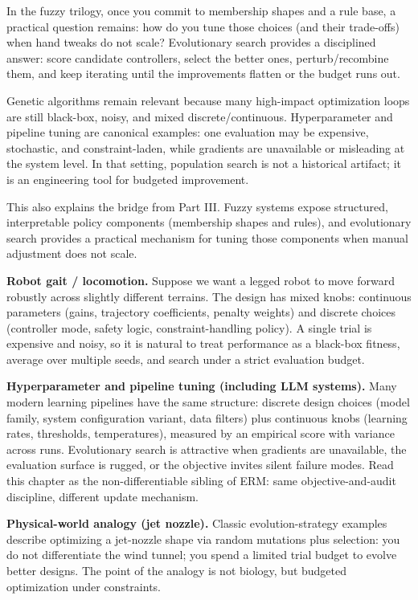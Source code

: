 In the fuzzy trilogy, once you commit to membership shapes and a rule base, a practical question remains: how do you tune those choices (and their trade-offs) when hand tweaks do not scale? Evolutionary search provides a disciplined answer: score candidate controllers, select the better ones, perturb/recombine them, and keep iterating until the improvements flatten or the budget runs out.

\begin{tcolorbox}[summarybox, title={Author's note: why GAs remain relevant in modern practice}]
Genetic algorithms remain relevant because many high-impact optimization loops are still black-box, noisy, and mixed discrete/continuous. Hyperparameter and pipeline tuning are canonical examples: one evaluation may be expensive, stochastic, and constraint-laden, while gradients are unavailable or misleading at the system level. In that setting, population search is not a historical artifact; it is an engineering tool for budgeted improvement.
\par\smallskip
This also explains the bridge from Part III. Fuzzy systems expose structured, interpretable policy components (membership shapes and rules), and evolutionary search provides a practical mechanism for tuning those components when manual adjustment does not scale.
\end{tcolorbox}

\begin{tcolorbox}[summarybox, title={Application note: budgeted search in practice}]
\textbf{Robot gait / locomotion.} Suppose we want a legged robot to move forward robustly across slightly different terrains. The design has mixed knobs: continuous parameters (gains, trajectory coefficients, penalty weights) and discrete choices (controller mode, safety logic, constraint-handling policy). A single trial is expensive and noisy, so it is natural to treat performance as a black-box fitness, average over multiple seeds, and search under a strict evaluation budget.\par
\textbf{Hyperparameter and pipeline tuning (including LLM systems).} Many modern learning pipelines have the same structure: discrete design choices (model family, system configuration variant, data filters) plus continuous knobs (learning rates, thresholds, temperatures), measured by an empirical score with variance across runs. Evolutionary search is attractive when gradients are unavailable, the evaluation surface is rugged, or the objective invites silent failure modes. Read this chapter as the non\hyp{}differentiable sibling of ERM: same objective\hyp{}and\hyp{}audit discipline, different update mechanism.\par
\textbf{Physical-world analogy (jet nozzle).} Classic evolution-strategy examples describe optimizing a jet-nozzle shape via random mutations plus selection: you do not differentiate the wind tunnel; you spend a limited trial budget to evolve better designs. The point of the analogy is not biology, but budgeted optimization under constraints.
\end{tcolorbox}

